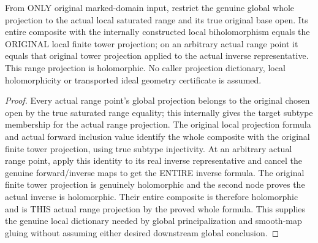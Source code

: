 \begin{theorem}
\label{hir:original-terminal-local-actual-range-whole-projection-dictionary}
\leanok
{}
From ONLY original marked-domain input, restrict the genuine global whole
projection to the actual local saturated range and its true original base
open. Its entire composite with the internally constructed local
biholomorphism equals the ORIGINAL local finite tower projection; on an
arbitrary actual range point it equals that original tower projection
applied to the actual inverse representative. This range projection is
holomorphic. No caller projection dictionary, local holomorphicity or
transported ideal geometry certificate is assumed.
\end{theorem}
\begin{proof}
Every actual range point's global projection belongs to the original
chosen open by the true saturated range equality; this internally gives
the target subtype membership for the actual range projection. The
original local projection formula and actual forward inclusion value
identify the whole composite with the original finite tower projection,
using true subtype injectivity. At an arbitrary actual range point,
apply this identity to its real inverse representative and cancel the
genuine forward/inverse maps to get the ENTIRE inverse formula. The
original finite tower projection is genuinely holomorphic and the second
node proves the actual inverse is holomorphic. Their entire composite
is therefore holomorphic and is THIS actual range projection by the
proved whole formula. This supplies the genuine local dictionary needed
by global principalization and smooth-map gluing without assuming either
desired downstream global conclusion.
\end{proof}
